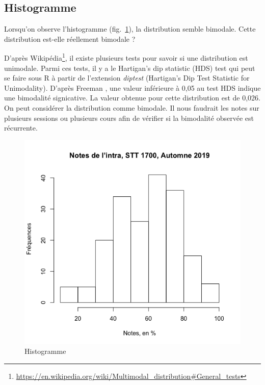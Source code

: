 \documentclass[10pt,twocolumn]{article}
\begin{document}
\subsection{Histogramme}
\label{histogramme}
Lorsqu’on observe l’histogramme (fig.~\ref{intraHist}), la distribution semble bimodale. Cette distribution est-elle réellement bimodale ?

D’après Wikipédia\footnote{\url{https://en.wikipedia.org/wiki/Multimodal\_distribution\#General\_tests}}, il existe plusieurs tests pour savoir si une distribution est unimodale. Parmi ces tests, il y a le Hartigan’s dip statistic (HDS) test qui peut se faire sous R à partir de l’extension \textit{diptest} (Hartigan's Dip Test Statistic for Unimodality). D’après Freeman \cite{Freeman:2013aa}, une valeur inférieure à 0,05 au test HDS indique une bimodalité signicative. La valeur obtenue pour cette distribution est de 0,026. On peut considérer la distribution comme bimodale. Il nous faudrait les notes sur plusieurs sessions ou plusieurs cours afin de vérifier si la bimodalité observée est récurrente. 



\begin{figure}[htbp]
	\caption{Histogramme}
	\label{intraHist}
	\centering
	\includegraphics[width=\linewidth]{d1_intraHist}
\end{figure}
\end{document}
